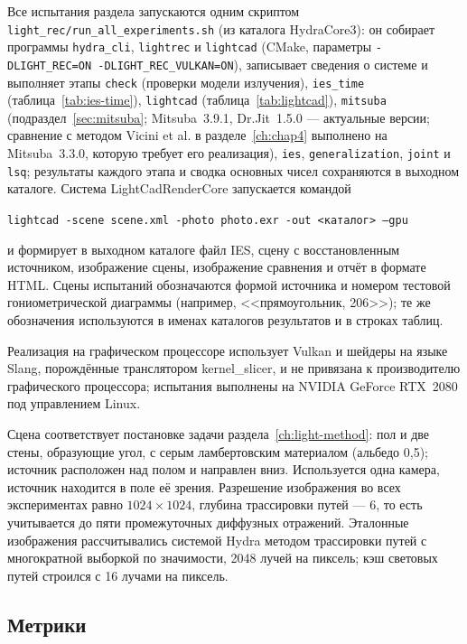 Все испытания раздела запускаются одним скриптом \texttt{light\_rec/run\_all\_experiments.sh} (из каталога HydraCore3): он собирает программы \texttt{hydra\_cli}, \texttt{lightrec} и \texttt{lightcad} (CMake, параметры \texttt{-DLIGHT\_REC=ON -DLIGHT\_REC\_VULKAN=ON}), записывает сведения о системе и выполняет этапы \texttt{check} (проверки модели излучения), \texttt{ies\_time} (таблица~\ref{tab:ies-time}), \texttt{lightcad} (таблица~\ref{tab:lightcad}), \texttt{mitsuba} (подраздел~\ref{sec:mitsuba}; Mitsuba~3.9.1, Dr.Jit~1.5.0 --- актуальные версии; сравнение с методом Vicini et al. в разделе~\ref{ch:chap4} выполнено на Mitsuba~3.3.0, которую требует его реализация), \texttt{ies}, \texttt{generalization}, \texttt{joint} и \texttt{lsq}; результаты каждого этапа и сводка основных чисел сохраняются в выходном каталоге. Система LightCadRenderCore запускается командой
\begin{center}
\texttt{lightcad -scene scene.xml -photo photo.exr -out <каталог> --gpu}
\end{center}
и формирует в выходном каталоге файл IES, сцену с восстановленным источником, изображение сцены, изображение сравнения и отчёт в формате HTML. Сцены испытаний обозначаются формой источника и номером тестовой гониометрической диаграммы (например, <<прямоугольник, 206>>); те же обозначения используются в именах каталогов результатов и в строках таблиц.

Реализация на графическом процессоре использует Vulkan и шейдеры на языке Slang, порождённые транслятором kernel\_slicer, и не привязана к производителю графического процессора; испытания выполнены на NVIDIA GeForce RTX~2080 под управлением Linux.

Сцена соответствует постановке задачи раздела~\ref{ch:light-method}: пол и две стены, образующие угол, с серым ламбертовским материалом (альбедо 0,5); источник расположен над полом и направлен вниз. Используется одна камера, источник находится в поле её зрения. Разрешение изображения во всех экспериментах равно $1024\times1024$, глубина трассировки путей --- 6, то есть учитывается до пяти промежуточных диффузных отражений. Эталонные изображения рассчитывались системой Hydra методом трассировки путей с многократной выборкой по значимости, 2048 лучей на пиксель; кэш световых путей строился с 16 лучами на пиксель.

\subsection{Метрики}

